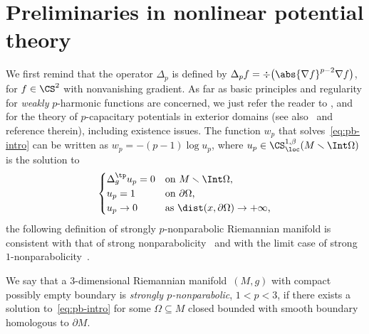 \section{Preliminaries in nonlinear potential theory}
\label{sec:2}
We first remind that the operator $\Delta_p$ is defined by $\Delta_p f = \div \big(\abs{\nabla f}^{p-2}\nabla f\big)$, for $f \in \CS^2$ with nonvanishing gradient.
As far as basic principles and regularity for \emph{weakly} $p$-harmonic functions are concerned, we just refer the reader to
\cite{dibenedetto_alphalocalregularityweak_1983,evans_newprooflocal1_1982,heinonen_asuperharmonicfunctionssupersolutionsdegenerate_1988,ladyzenskaja_linearquasilinearellipticequations_1968,lewis_regularityderivativessolutionscertain_1983,lieberman_boundaryregularitysolutionsdegenerate_1988,serrin_localbehaviorsolutionsquasilinear_1964,tolksdorf_dirichletproblemquasilinearequations_1983,trudinger_harnacktypeinequalitiestheir_1967,uraltseva_degeneratequasilinearellipticsystems_1968,valtorta_laplaceoperatorriemannianmanifolds_2013}, and~\cite{holopainen_nonlinearpotentialtheoryquasiregular_1990,holopainen_volumegrowthgreenfunctions_1999} for the theory of $p$-capacitary potentials in exterior domains (see also~\cite[Chapter 1]{benatti_monotonicityformulasnonlinearpotential_2022} and reference therein), including existence issues. The function $w_p$ that solves~\eqref{eq:pb-intro} can be written as $w_p= -(p-1)\log u_p$, where $u_p \in \CS^{1,\beta}_{\loc}(M \smallsetminus \Int \Omega)$ is the solution to
\begin{equation}\label{eq:p-cap-potential}
 \begin{cases}
 \Delta^{\tp}_g u_p = 0 &\text{on $M \smallsetminus \Int \Omega$,}\\
 u_p=1 & \text{on $\partial \Omega$,}\\
 u_p\to 0 & \text{as $\dist(x,\partial \Omega)\to +\infty$,}
 \end{cases}
\end{equation}
the following definition of strongly $p$-nonparabolic Riemannian manifold is consistent with that of strong nonparabolicity~\cite{ni_meanvaluetheoremsmanifolds_2007} and with the limit case of strong $1$-nonparabolicity~\cite{benatti_isoperimetricriemannianpenroseinequality_2022}.

\begin{Definition}
We say that a $3$-dimensional Riemannian manifold~$(M,g)$ with compact possibly empty boundary is \emph{strongly $p$-nonparabolic}, $1<p<3$, if there exists a solution to~\eqref{eq:pb-intro} for some $\Omega \subseteq M$ closed bounded with smooth boundary homologous to $\partial M$.
\end{Definition}

